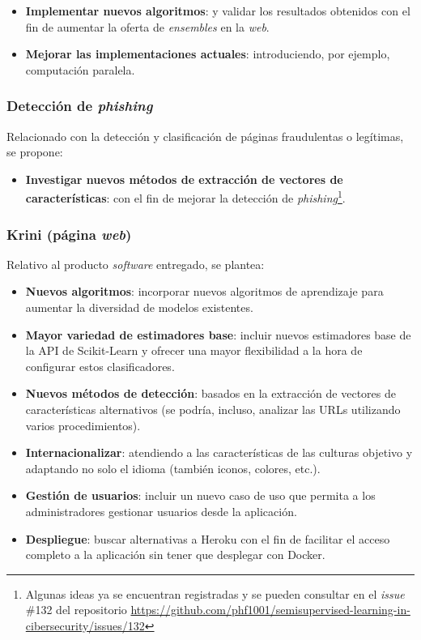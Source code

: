\begin{itemize}
	\item \textbf{Implementar nuevos algoritmos}: y validar los resultados obtenidos con el fin de aumentar la oferta de \textit{ensembles} en la \textit{web}.
	\item \textbf{Mejorar las implementaciones actuales}: introduciendo, por ejemplo, computación paralela.
\end{itemize}

\subsubsection{Detección de \textit{phishing}}

Relacionado con la detección y clasificación de páginas fraudulentas o legítimas, se propone:

\begin{itemize}
	\item \textbf{Investigar nuevos métodos de extracción de vectores de características}: con el fin de mejorar la detección de \textit{phishing}\footnote{Algunas ideas ya se encuentran registradas y se pueden consultar en el \textit{issue} \#132 del repositorio \url{https://github.com/phf1001/semisupervised-learning-in-cibersecurity/issues/132}}.
\end{itemize}


\subsubsection{Krini (página \textit{web})}

Relativo al producto \textit{software} entregado, se plantea:

\begin{itemize}
	\item \textbf{Nuevos algoritmos}: incorporar nuevos algoritmos de aprendizaje para aumentar la diversidad de modelos existentes.
	\item  \textbf{Mayor variedad de estimadores base}: incluir nuevos estimadores base de la API de Scikit-Learn y ofrecer una mayor flexibilidad a la hora de configurar estos clasificadores.
	\item \textbf{Nuevos métodos de detección}: basados en la extracción de vectores de características alternativos (se podría, incluso, analizar las URLs utilizando varios procedimientos).
	\item \textbf{Internacionalizar}: atendiendo a las características de las culturas objetivo y adaptando no solo el idioma (también iconos, colores, etc.).
	\item \textbf{Gestión de usuarios}: incluir un nuevo caso de uso que permita a los administradores gestionar usuarios desde la aplicación.
	\item \textbf{Despliegue}: buscar alternativas a Heroku con el fin de facilitar el acceso completo a la aplicación sin tener que desplegar con Docker.
\end{itemize}